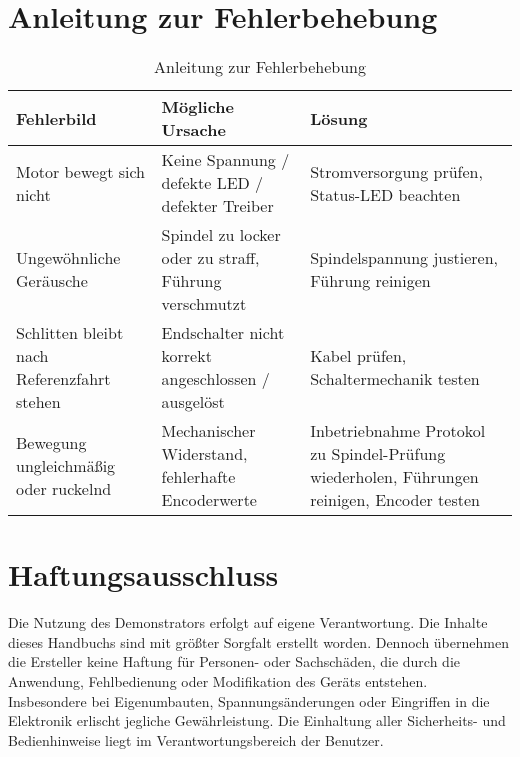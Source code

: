 \documentclass[a4paper,12pt]{report}
\begin{document}
	\chapter{Anleitung zur Fehlerbehebung}
	\begin{table}[h]
		\centering
		\begin{tabular}{|p{4cm}|p{5cm}|p{4cm}|}
			\hline
			\textbf{Fehlerbild} & \textbf{Mögliche Ursache} & \textbf{Lösung} \\ \hline
			Motor bewegt sich nicht & Keine Spannung / defekte LED / defekter Treiber & Stromversorgung prüfen, Status-LED beachten \\ \hline
			Ungewöhnliche Geräusche & Spindel zu locker oder zu straff, Führung verschmutzt & Spindelspannung justieren, Führung reinigen \\ \hline
			Schlitten bleibt nach Referenzfahrt stehen & Endschalter nicht korrekt angeschlossen / ausgelöst & Kabel prüfen, Schaltermechanik testen \\ \hline
			Bewegung ungleichmäßig oder ruckelnd & Mechanischer Widerstand, fehlerhafte Encoderwerte & Inbetriebnahme Protokol zu Spindel-Prüfung wiederholen, Führungen reinigen, Encoder testen \\ \hline
		\end{tabular}
		\caption{Anleitung zur Fehlerbehebung}
		\label{tab:fehlerbehebung}
	\end{table}
	
	\chapter{Haftungsausschluss}
	\begin{itemize}[leftmargin=1.5em]
		Die Nutzung des Demonstrators erfolgt auf eigene Verantwortung. Die Inhalte dieses Handbuchs sind mit größter Sorgfalt erstellt worden. Dennoch übernehmen die Ersteller keine Haftung für Personen- oder Sachschäden, die durch die Anwendung, Fehlbedienung oder Modifikation des Geräts entstehen. \\
		
		Insbesondere bei Eigenumbauten, Spannungsänderungen oder Eingriffen in die Elektronik erlischt jegliche Gewährleistung. Die Einhaltung aller Sicherheits- und Bedienhinweise liegt im Verantwortungsbereich der Benutzer. 
	\end{itemize}
	
	
\end{document}
